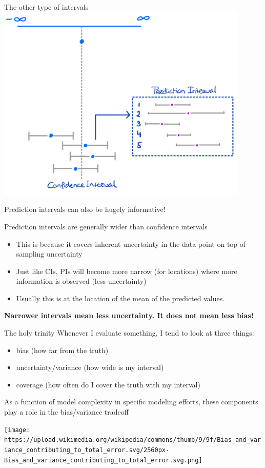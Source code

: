 \documentclass[
  ignorenonframetext,
]{beamer}
\providecommand{\tightlist}{%
  \setlength{\itemsep}{0pt}\setlength{\parskip}{0pt}}\usepackage{longtable,booktabs,array}
\begin{document}
\begin{frame}{The other type of intervals}
\protect\hypertarget{the-other-type-of-intervals}{}
\includegraphics[width=0.9\textwidth,height=\textheight]{img/8. prediction_intervals.png}

Prediction intervals can also be hugely informative!

Prediction intervals are generally wider than confidence intervals

\begin{itemize}
\tightlist
\item
  This is because it covers inherent uncertainty in the data point on
  top of sampling uncertainty
\item
  Just like CIs, PIs will become more narrow (for locations) where more
  information is observed (less uncertainty)
\item
  Usually this is at the location of the mean of the predicted values.
\end{itemize}

\textbf{Narrower intervals mean less uncertainty. It does not mean less
bias!}
\end{frame}

\begin{frame}{The holy trinity}
\protect\hypertarget{the-holy-trinity}{}
Whenever I evaluate something, I tend to look at three things:

\begin{itemize}
\tightlist
\item
  bias (how far from the truth)
\item
  uncertainty/variance (how wide is my interval)
\item
  coverage (how often do I cover the truth with my interval)
\end{itemize}

As a function of model complexity in specific modeling efforts, these
components play a role in the bias/variance tradeoff

\texttt{[image: https://upload.wikimedia.org/wikipedia/commons/thumb/9/9f/Bias\_and\_variance\_contributing\_to\_total\_error.svg/2560px-Bias\_and\_variance\_contributing\_to\_total\_error.svg.png]}
\end{frame}
\end{document}
